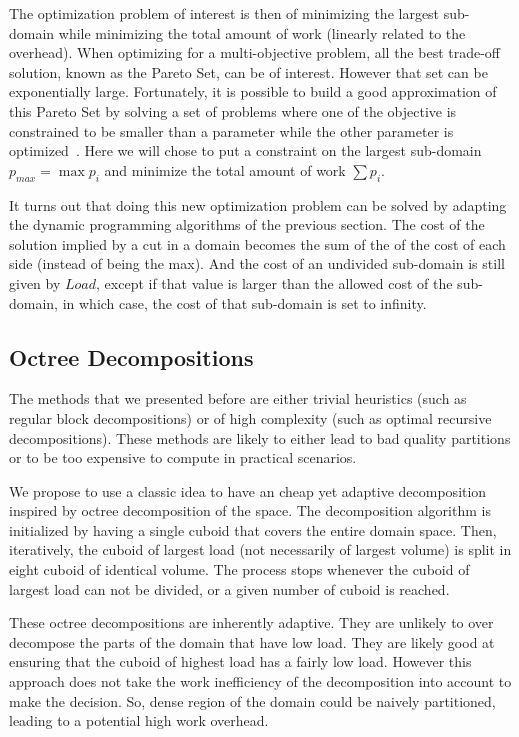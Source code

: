 \documentclass{article}
\begin{document}
The optimization problem of interest is then of minimizing the largest
sub-domain while minimizing the total amount of work (linearly related
to the overhead). When optimizing for a multi-objective problem, all
the best trade-off solution, known as the Pareto Set, can be of
interest. However that set can be exponentially large. Fortunately, it
is possible to build a good approximation of this Pareto Set by
solving a set of problems where one of the objective is constrained to
be smaller than a parameter while the other parameter is
optimized~\cite{papayanna2000:pareto}. Here we will chose to put a
constraint on the largest sub-domain $p_{max} = \max p_i$ and minimize
the total amount of work $\sum p_i$.

It turns out that doing this new optimization problem can be solved by
adapting the dynamic programming algorithms of the previous
section. The cost of the solution implied by a cut in a domain becomes
the sum of the of the cost of each side (instead of being the
max). And the cost of an undivided sub-domain is still given by $Load$,
except if that value is larger than the allowed cost of the sub-domain,
in which case, the cost of that sub-domain is set to infinity.

\subsection{Octree Decompositions}

\label{sec:heuristics}

The methods that we presented before are either trivial heuristics
(such as regular block decompositions) or of high complexity (such as
optimal recursive decompositions). These methods are likely to either
lead to bad quality partitions or to be too expensive to compute in
practical scenarios.

We propose to use a classic idea to have an cheap yet adaptive
decomposition inspired by octree decomposition of the space. The
decomposition algorithm is initialized by having a single cuboid that
covers the entire domain space. Then, iteratively, the cuboid of
largest load (not necessarily of largest volume) is split in eight
cuboid of identical volume. The process stops whenever the cuboid of
largest load can not be divided, or a given number of cuboid is reached.

These octree decompositions are inherently adaptive. They are unlikely
to over decompose the parts of the domain that have low load. They are
likely good at ensuring that the cuboid of highest load has a fairly
low load. However this approach does not take the work inefficiency of
the decomposition into account to make the decision. So, dense region
of the domain could be naively partitioned, leading to a potential
high work overhead.
\end{document}
